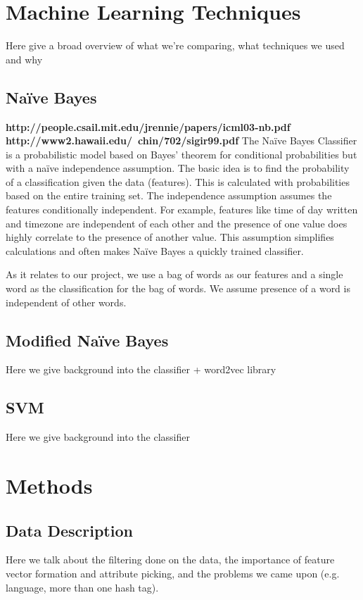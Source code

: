 \documentclass[11pt,letterpaper]{article}
\begin{document}
\section{Machine Learning Techniques}
Here give a broad overview of what we're comparing, what techniques we used and why

\subsection{Na{\"i}ve Bayes}
\textbf{http://people.csail.mit.edu/jrennie/papers/icml03-nb.pdf} \textbf{http://www2.hawaii.edu/~chin/702/sigir99.pdf}
  The Na{\"i}ve Bayes Classifier is a probabilistic model based on Bayes' theorem for conditional probabilities but with a na{\"i}ve independence assumption. The basic idea is to find the probability of a classification given the data  (features). This is calculated with probabilities based on the entire training set. The independence assumption assumes the features conditionally independent. For example, features like time of day written and timezone are independent of each other and the presence of one value does highly correlate to the presence of another value. This assumption simplifies calculations and often makes Na{\"i}ve Bayes a quickly trained classifier.

As it relates to our project, we use a bag of words as our features and a single word as the classification for the bag of words. We assume presence of a word is independent of other words. 


\subsection{Modified Na{\"i}ve Bayes}
Here we give background into the classifier + word2vec library

\subsection{SVM}
Here we give background into the classifier

\section{Methods}
\subsection{Data Description}
Here we talk about the filtering done on the data, the importance of feature vector formation and attribute picking, and the problems we came upon (e.g. language, more than one hash tag).
\end{document}
